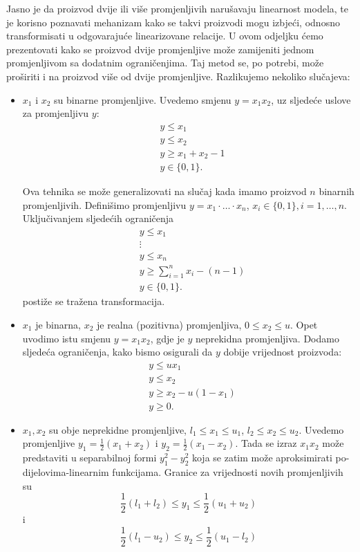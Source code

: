 \documentclass[b5paper, utf8, 11pt, colorlinks]{book}
\theoremstyle{definition}
\begin{document}
Jasno je da proizvod dvije ili više promjenljivih narušavaju linearnost modela, te je korisno poznavati mehanizam kako se takvi proizvodi mogu izbjeći, odnosno transformisati u odgovarajuće linearizovane relacije. U ovom odjeljku ćemo prezentovati kako se proizvod dvije promjenljive može zamijeniti jednom promjenljivom  sa dodatnim ograničenjima. Taj metod se, po potrebi, može proširiti i na proizvod više od dvije promjenljive. Razlikujemo nekoliko slučajeva:
\begin{itemize}
	\item $x_1$ i $x_2$ su binarne promjenljive. Uvedemo smjenu $y=x_1 x_2$, uz sljedeće uslove za promjenljivu $y$:
	\begin{align*}
		&y \leq x_1 \\
		&y \leq x_2 \\
		& y \geq x_1 + x_2 - 1 \\
		& y \in \{0, 1\}.
	\end{align*}
	
	Ova tehnika se može generalizovati na slučaj kada imamo proizvod $n$ binarnih promjenljivih. Definišimo promjenljivu  $y = x_1 \cdot \ldots \cdot x_n$, $x_i\in\{0,1\}, i=1,\ldots ,n$. Uključivanjem sljedećih ograničenja 
	\begin{align*}
		&y \leq x_1 \\
		& \vdots \\
		&y \leq x_n \\
		& y \geq \sum_{i=1}^n x_i - (n-1) \\
		& y \in \{0, 1\}.
	\end{align*}
	postiže se tražena transformacija.
	
	\item $x_1$ je binarna, $x_2$ je realna (pozitivna) promjenljiva, $0 \leq x_2 \leq u$. Opet uvodimo istu smjenu $y= x_1 x_2$, gdje je $y$ neprekidna promjenljiva. Dodamo sljedeća ograničenja, kako bismo osigurali da $y$    dobije vrijednost proizvoda:
	\begin{align*}
		&y \leq u x_1 \\
		&y \leq x_2 \\
		& y \geq x_2 - u(1-x_1) \\
		& y \geq 0.
	\end{align*}
	
	\item $x_1, x_2$ su obje neprekidne promjenljive, $l_1 \leq x_1 \leq u_1$, $l_2 \leq x_2 \leq u_2$. Uvedemo promjenljive $y_1 = \frac{1}{2}( x_1 + x_2) $ i  $y_2 =\frac{1}{2}(x_1 - x_2)$. Tada se izraz $x_1x_2$ može predstaviti u separabilnoj formi $y_1^2 - y_2^2$ koja se zatim može aproksimirati po-dijelovima-linearnim funkcijama. Granice za vrijednosti novih promjenljivih su 
	$$ \frac{1}{2}(l_1 + l_2) \leq y_1 \leq \frac{1}{2}(u_1 + u_2)$$ i 
	$$ \frac{1}{2}(l_1 - u_2) \leq y_2 \leq \frac{1}{2}(u_1 - l_2) $$
	
\end{itemize} 
\end{document}
